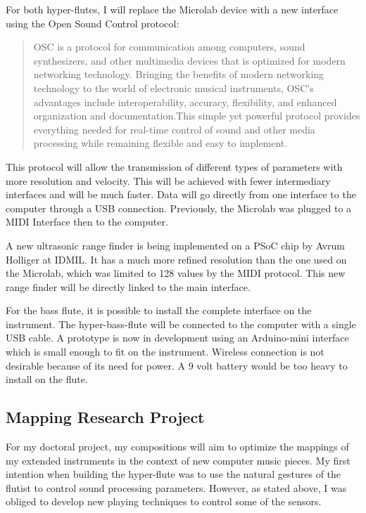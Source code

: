 For both hyper-flutes, I will replace the Microlab device with a new interface using the Open Sound Control protocol:

\begin{quotation}
OSC is a protocol for communication among computers, sound synthesizers, and other multimedia devices that is optimized for modern networking technology. Bringing the benefits of modern networking technology to the world of electronic musical instruments, OSC's advantages include interoperability, accuracy, flexibility, and enhanced organization and documentation.This simple yet powerful protocol provides everything needed for real-time control of sound and other media processing while remaining flexible and easy to implement. \cite{Wright:2005} 
\end{quotation}

This protocol will allow the transmission of different types of parameters with more resolution and velocity. This will be achieved with fewer intermediary interfaces and will be much faster. Data will go directly from one interface to the computer through a USB connection. Previously, the Microlab was plugged to a MIDI Interface then to the computer.

A new ultrasonic range finder is being implemented on a PSoC chip by Avrum Holliger at IDMIL. It has a much more refined resolution than the one used on the Microlab, which was limited to 128 values by the MIDI protocol. This new range finder will be directly linked to the main interface.

For the bass flute, it is possible to install the complete interface on the instrument.  The hyper-bass-flute will be connected to the computer with a single USB cable. A prototype is now in development using an Arduino-mini interface which is small enough to fit on the instrument. Wireless connection is not desirable because of its need for power. A 9 volt battery would be too heavy to install on the flute. 

\subsection{Mapping Research Project}

For my doctoral project, my compositions will aim to optimize the mappings of my extended instruments in the context of new computer music pieces. My first intention when building the hyper-flute was to use the natural gestures of the flutist to control sound processing parameters.  However, as stated above, I was obliged to develop new playing techniques to control some of the sensors. 


